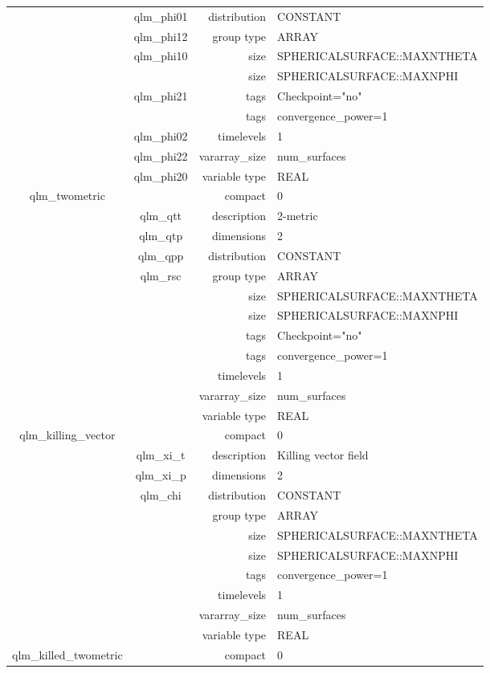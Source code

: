 \begin{tabular*}{150mm}{|c|c@{\extracolsep{\fill}}|rl|}
 & qlm\_phi01 & distribution & CONSTANT \\ 
 & qlm\_phi12 & group type & ARRAY \\ 
 & qlm\_phi10 & size & SPHERICALSURFACE::MAXNTHETA \\ 
& ~ & size & SPHERICALSURFACE::MAXNPHI \\ 
 & qlm\_phi21 & tags & Checkpoint="no" \\ 
& ~ & tags & convergence\_power=1 \\ 
 & qlm\_phi02 & timelevels & 1 \\ 
 & qlm\_phi22 & vararray\_size & num\_surfaces \\ 
 & qlm\_phi20 & variable type & REAL \\ 
\hline 
qlm\_twometric &  & compact & 0 \\ 
 & qlm\_qtt & description & 2-metric \\ 
 & qlm\_qtp & dimensions & 2 \\ 
 & qlm\_qpp & distribution & CONSTANT \\ 
 & qlm\_rsc & group type & ARRAY \\ 
 &  & size & SPHERICALSURFACE::MAXNTHETA \\ 
& ~ & size & SPHERICALSURFACE::MAXNPHI \\ 
 &  & tags & Checkpoint="no" \\ 
& ~ & tags & convergence\_power=1 \\ 
 &  & timelevels & 1 \\ 
 &  & vararray\_size & num\_surfaces \\ 
 &  & variable type & REAL \\ 
\hline 
qlm\_killing\_vector &  & compact & 0 \\ 
 & qlm\_xi\_t & description & Killing vector field \\ 
 & qlm\_xi\_p & dimensions & 2 \\ 
 & qlm\_chi & distribution & CONSTANT \\ 
 &  & group type & ARRAY \\ 
 &  & size & SPHERICALSURFACE::MAXNTHETA \\ 
& ~ & size & SPHERICALSURFACE::MAXNPHI \\ 
 &  & tags & convergence\_power=1 \\ 
 &  & timelevels & 1 \\ 
 &  & vararray\_size & num\_surfaces \\ 
 &  & variable type & REAL \\ 
\hline 
qlm\_killed\_twometric &  & compact & 0 \\ 

\end{tabular*}
